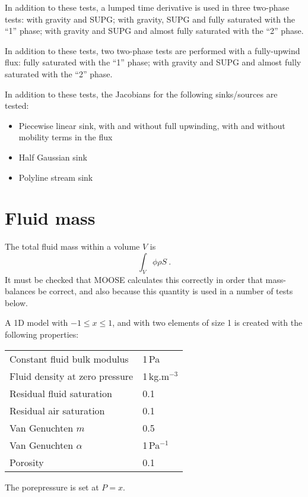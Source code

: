 \documentclass[]{scrreprt}
\begin{document}
In addition to these tests, a lumped time derivative is used in three
two-phase tests: with gravity and SUPG; with gravity, SUPG and fully
saturated with the ``1'' phase; with gravity and SUPG and almost fully
saturated with the ``2'' phase.

In addition to these tests, two two-phase tests are performed with a
fully-upwind flux: fully saturated with the ``1'' phase; with gravity
and SUPG and almost fully saturated with the ``2'' phase.

In addition to these tests, the Jacobians for the following sinks/sources are tested:
\begin{itemize}
\item Piecewise linear sink, with and without full upwinding, with and without mobility terms in the flux
\item Half Gaussian sink
\item Polyline stream sink
\end{itemize}



\chapter{Fluid mass}
\label{ma}

The total fluid mass within a volume $V$ is
\begin{equation}
\int_{V} \phi\rho S \ .
\end{equation}
It must be checked that MOOSE calculates this correctly in order that
mass-balances be correct, and also because this quantity is used in a
number of tests below.

A 1D model with $-1\leq x \leq 1$, and with two elements of size 1 is
created with the following properties:
\begin{center}
\begin{tabular}{|ll|}
\hline
Constant fluid bulk modulus & 1\,Pa \\
Fluid density at zero pressure & 1\,kg.m$^{-3}$ \\
Residual fluid saturation & 0.1 \\
Residual air saturation & 0.1 \\
Van Genuchten $m$ & 0.5 \\
Van Genuchten $\alpha$ & 1\,Pa$^{-1}$ \\
Porosity & 0.1 \\
\hline
\end{tabular}
\end{center}
The porepressure is set at $P=x$.
\end{document}
